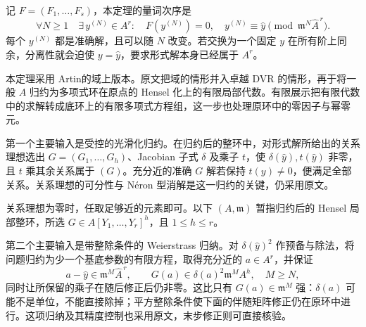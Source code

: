 记 \(F=(F_1,\ldots,F_s)\)，本定理的量词次序是
\[
	\forall N\ge1\quad\exists\,y^{(N)}\in A^r: \quad F(y^{(N)})=0,\quad y^{(N)}\equiv\widehat y\pmod{\mathfrak m^N\widehat A^{\,r}}.
\]
每个 \(y^{(N)}\) 都是准确解，且可以随 \(N\) 改变。若交换为一个固定 \(y\) 在所有阶上同余，分离性就会迫使 \(y=\widehat y\)，要求形式解本身已经属于 \(A^r\)。

\begin{proofsketch}
	本定理采用 Artin\cite[Theorem (1.10), p. 26]{Artin1969AlgebraicApproximation}的域上版本。原文把域的情形并入卓越 DVR 的情形，再于\cite[Section 5, pp. 42--44]{Artin1969AlgebraicApproximation}将一般 \(A\) 归约为多项式环在原点的 Hensel 化上的有限局部代数。有限展示把有限代数中的求解转成底环上的有限多项式方程组，这一步也处理原环中的零因子与幂零元。

	第一个主要输入是受控的光滑化归约\cite[Section 5, Lemma (5.6), pp. 44--46; Lemma (5.9), pp. 46--47]{Artin1969AlgebraicApproximation}。在归约后的整环中，对形式解所给出的关系理想选出 \(G=(G_1,\ldots,G_h)\)、Jacobian 子式 \(\delta\) 及乘子 \(t\)，使 \(\delta(\widehat y),t(\widehat y)\) 非零，且 \(t\) 乘其余关系属于 \((G)\)。充分近的准确 \(G\) 解若保持 \(t(y)\ne0\)，便满足全部关系。关系理想的可分性与 N\'eron 型消解是这一归约的关键，仍采用原文。

	关系理想为零时，任取足够近的元素即可。以下 \((A,\mathfrak m)\) 暂指归约后的 Hensel 局部整环，所选 \(G\in A[Y_1,\ldots,Y_r]^h\)，且 \(1\le h\le r\)。

	第二个主要输入是带整除条件的 Weierstrass 归纳\cite[Lemma (5.12), pp. 48--50]{Artin1969AlgebraicApproximation}。对 \(\delta(\widehat y)^2\) 作预备与除法，将问题归约为少一个基底参数的有限方程，取得充分近的 \(a\in A^r\)，并保证
	\[
		a-\widehat y\in\mathfrak m^M\widehat A^{\,r},\qquad G(a)\in\delta(a)^2\mathfrak m^M A^h,\quad M\ge N,
	\]
	同时让所保留的乘子在随后修正后仍非零。这比只有 \(G(a)\in\mathfrak m^M\) 强：\(\delta(a)\) 可能不是单位，不能直接除掉；平方整除条件使下面的伴随矩阵修正仍在原环中进行。这项归纳及其精度控制也采用原文，末步修正则可直接核验。


\end{proofsketch}
